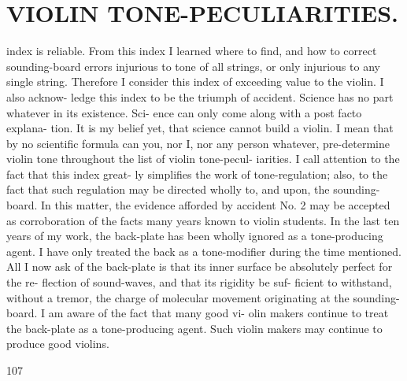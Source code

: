 \documentclass{article}
\begin{document}
\section*{VIOLIN TONE-PECULIARITIES.}
index is reliable. From this index I learned where to find, and how to correct sounding-board errors injurious to tone of all strings, or only injurious to any single string. Therefore I consider this index of exceeding value to the violin. I also acknow- ledge this index to be the triumph of accident. Science has no part whatever in its existence. Sci- ence can only come along with a post facto explana- tion. It is my belief yet, that science cannot build a violin. I mean that by no scientific formula can you, nor I, nor any person whatever, pre-determine violin tone throughout the list of violin tone-pecul- iarities. I call attention to the fact that this index great- ly simplifies the work of tone-regulation; also, to the fact that such regulation may be directed wholly to, and upon, the sounding-board. In this matter, the evidence afforded by accident No. 2 may be accepted as corroboration of the facts many years known to violin students. In the last ten years of my work, the back-plate has been wholly ignored as a tone-producing agent. I have only treated the back as a tone-modifier during the time mentioned. All I now ask of the back-plate is that its inner surface be absolutely perfect for the re- flection of sound-waves, and that its rigidity be suf- ficient to withstand, without a tremor, the charge of molecular movement originating at the sounding- board. I am aware of the fact that many good vi- olin makers continue to treat the back-plate as a tone-producing agent. Such violin makers may continue to produce good violins.

107
\end{document}
